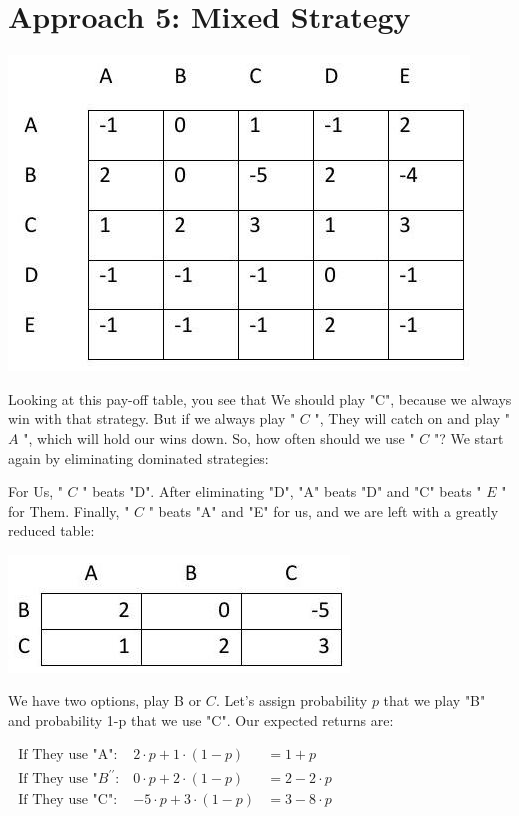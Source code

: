 \documentclass[10pt]{article}
\begin{document}
\section{Approach 5: Mixed Strategy}
\includegraphics[max width=\textwidth]{2022_07_05_5945264bba2a5f6ba667g-70}

Looking at this pay-off table, you see that We should play "C", because we always win with that strategy. But if we always play " $C$ ", They will catch on and play " $A$ ", which will hold our wins down. So, how often should we use " $C$ "? We start again by eliminating dominated strategies:

For Us, " $C$ " beats "D". After eliminating "D", "A" beats "D" and "C" beats " $E$ " for Them. Finally, " $C$ " beats "A" and "E" for us, and we are left with a greatly reduced table:

\includegraphics[max width=\textwidth]{2022_07_05_5945264bba2a5f6ba667g-70(1)}

We have two options, play B or $C$. Let's assign probability $p$ that we play "B" and probability 1-p that we use "C". Our expected returns are:

$\begin{array}{lll}\text { If They use "A": } & 2 \cdot p+1 \cdot(1-p) & =1+p \\ \text { If They use "} B^{\prime \prime}: & 0 \cdot p+2 \cdot(1-p) & =2-2 \cdot p \\ \text { If They use "C": } & -5 \cdot p+3 \cdot(1-p) & =3-8 \cdot p\end{array}$
\end{document}
